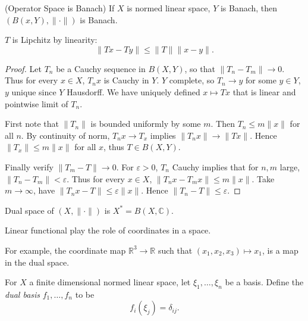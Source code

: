 \begin{proposition}(Operator Space is Banach)
	\label{prop:OperatorSpaceIsBanach}
	If $X$ is normed linear space, $Y$ is Banach, then $\left( B(x, Y), \|\cdot \| \right) $ is Banach.
\end{proposition}

\begin{remark}
	$T$ is Lipchitz by linearity:
	\[
		\|T x - T y\| \le \|T\| \|x - y\|
	.\] 
\end{remark}

\begin{proof}
	Let $T_n$ be a Cauchy sequence in $B(X, Y)$, so that $\|T_n - T_m\| \to 0$. Thus for every $x \in X$, $T_n x$ is Cauchy in $Y$. $Y$ complete, so $T_n \to y$ for some $y \in Y$, $y$ unique since $Y$ Hausdorff. 
	We have uniquely defined $x \mapsto T x$ that is linear and pointwise limit of $T_n$.

	First note that $\|T_n\|$ is bounded uniformly by some $m$. Then $T_n \le  m \| x\|$ for all $n$. By continuity of norm, $T_n x \to T_x $ implies $\|T_n x \|\to \|T x\|$. Hence $\|T_x\| \le  m \|x\|$ for all $x$, thus $T \in B(X, Y)$.

	Finally verify $\|T_m - T\| \to 0$. For $\varepsilon>0$, $T_n$ Cauchy implies that for $n, m$ large, $\|T_n - T_m\| < \varepsilon$. Thus for every $x \in X$, $\|T_n x - T_m x\|\le m \|x\|$. Take $m \to \infty $, have $\|T_n x - T \| \le  \varepsilon \|x\|$. Hence $\|T_n - T\|\le  \varepsilon$.
\end{proof}

\begin{definition}
	\label{defn:DualSpace}
	Dual space of $(X, \|\cdot \|)$ is $X^* = B(X, \mathbb{C})$.
\end{definition}

\begin{remark}
	Linear functional play the role of coordinates in a space.

	For example, the coordinate map $\mathbb{R}^3 \to \mathbb{R}$ such that $(x_1, x_2, x_3) \mapsto x_1$, is a map in the dual space.
\end{remark}

\begin{example}
	For $X$ a finite dimensional normed linear space, let $\xi_1, \ldots, \xi_n$ be a basis. Define the \textit{dual basis} $f_1, \ldots, f_n$ to be
	\[
		f_i(\xi_j) = \delta_{i j}
	.\] 
\end{example}

